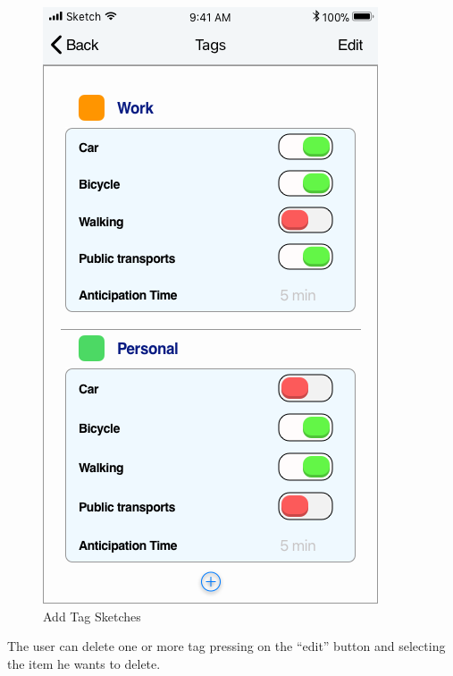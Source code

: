 \begin{figure}[H]
	\hspace{0.5cm}
	\includegraphics[scale=0.23]{Images/Interface/Tags/4_tags+work+personal}
	\caption{Add Tag Sketches}
\end{figure}
The user can delete one or more tag pressing on the “edit” button and selecting the item he wants to delete.
